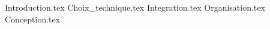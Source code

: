 \documentclass[french,a4paper,11pt]{article}
\begin{document}
    \tableofcontents
	\newpage

	{Introduction.tex} %
	{Choix_technique.tex} %
	{Integration.tex} %
	{Organisation.tex}
	{Conception.tex} %
    
\end{document}
